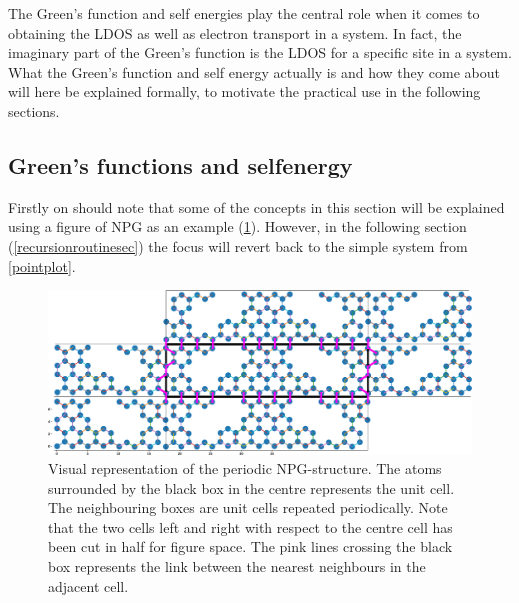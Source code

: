 The Green's function and self energies play the central role when it comes to obtaining the LDOS as well as electron transport in a system. In fact, the imaginary part of the Green's function is the LDOS for a specific site in a system. What the Green's function and self energy actually is and how they come about will here be explained formally, to motivate the practical use in the following sections.\subsection{Green's functions and selfenergy}\label{greensandself} 
Firstly on should note that some of the concepts in this section will be explained using a figure of NPG as an example (\cref{atomrepfig}). However, in the following section (\cref{recursionroutinesec}) the focus will revert back to the simple system from \cref{pointplot}. \begin{figure}[H]
	\centering
	\includegraphics[width=\textwidth]{Figures/representativestructure2.eps}
	\caption{Visual representation of the periodic NPG-structure. The atoms surrounded by the black box in the centre represents the unit cell. The neighbouring boxes are unit cells repeated periodically. Note that the two cells left and right with respect to the centre cell has been cut in half for figure space. The pink lines crossing the black box represents the link between the nearest neighbours in the adjacent cell.}
	\label{atomrepfig}
\end{figure}
